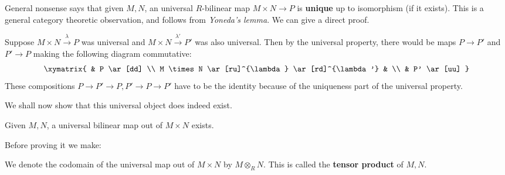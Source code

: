 General nonsense says that given $M,N$, an universal $R$-bilinear map $M \times N \to P$ is
\textbf{unique} up to isomorphism (if it exists). This is a general category
theoretic observation, and follows from \emph{Yoneda's lemma}.
We can give a direct proof.

Suppose $M \times N \stackrel{\lambda}{\to} P$ was universal and $M \times N
\stackrel{\lambda'}{\to} P'$ was also
universal. Then by the universal property, there would be maps $P \to P'$ and $P' \to P$ making the
following diagram commutative:
\[ 
\xymatrix{
& P \ar[dd] \\
M \times N \ar[ru]^{\lambda} \ar[rd]^{\lambda'} & \\
& P' \ar[uu]
}
\]
These compositions $P \to P' \to P, P' \to P \to P'$ have to be the identity
because of the uniqueness part of the universal property. 

We shall now show that this universal object does indeed exist.

\begin{proposition} \label{tensorexists}
Given $M,N$, a universal bilinear map out of $M \times N$ exists. 
\end{proposition} 

Before proving it we make:
\begin{definition} 
We denote the codomain of the universal map out of $M \times N $ by $M
\otimes_R N$. This is called the \textbf{tensor product} of $M,N$.
\end{definition} 

